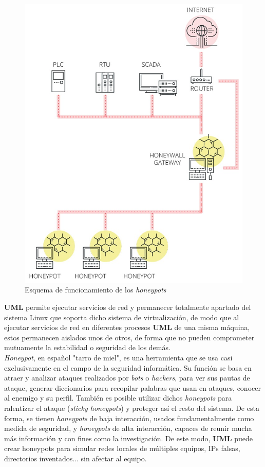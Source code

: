 \documentclass[11pt,twoside,titlepage,a4paper]{article}
\theoremstyle{definition}
\theoremstyle{plain_rojo}
\theoremstyle{remark}
\begin{document}
\begin{figure}[htp]
\centering
\includegraphics[scale=0.30]{figura_3.jpg}
\caption{Esquema de funcionamiento de los \textit{honeypots}}
\label{}
\end{figure}

\textbf{UML} permite ejecutar servicios de red y permanecer totalmente apartado del sistema Linux que soporta dicho sistema de virtualización, de modo que al ejecutar servicios de red en diferentes procesos \textbf{UML} de una misma máquina, estos permanecen aislados unos de otros, de forma que no pueden comprometer mutuamente la estabilidad o seguridad de los demás.
\\

\textit{Honeypot}, en español "tarro de miel", es una herramienta que se usa 
casi exclusivamente en el campo de la seguridad informática. Su función se 
basa en atraer y analizar ataques realizados por \textit{bots} o 
\textit{hackers}, para ver sus pautas de ataque, generar diccionarios para 
recopilar palabras que usan en ataques, conocer al enemigo y su perfil. 
También es posible utilizar dichos \textit{honeypots} para ralentizar el 
ataque (\textit{sticky honeypots}) y proteger así el resto del sistema. De 
esta forma, se tienen \textit{honeypots} de baja interacción, usados 
fundamentalmente como medida de seguridad, y \textit{honeypots} de alta 
interacción, capaces de reunir mucha más información y con fines como la 
investigación. De este modo, \textbf{UML} puede crear honeypots para simular 
redes locales de múltiples equipos, IPs falsas, directorios inventados... sin 
afectar al equipo.
\\
\end{document}
